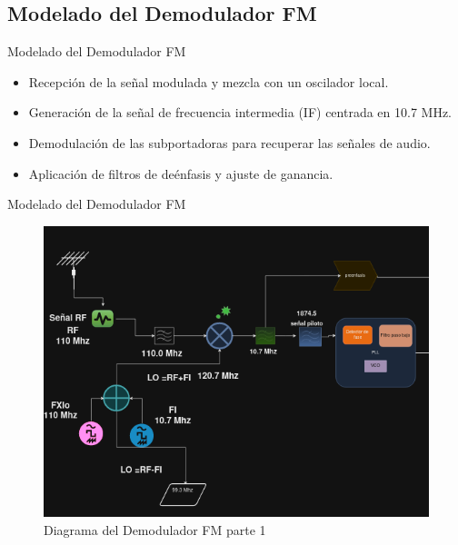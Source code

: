\documentclass[mathserif,spanish]{beamer}
\begin{document}
\subsection{Modelado del Demodulador FM}
\begin{frame}{Modelado del Demodulador FM}
    \begin{itemize}
        \item Recepción de la señal modulada y mezcla con un oscilador local.
        \item Generación de la señal de frecuencia intermedia (IF) centrada en 10.7 MHz.
        \item Demodulación de las subportadoras para recuperar las señales de audio.
        \item Aplicación de filtros de deénfasis y ajuste de ganancia.
    \end{itemize}
    
\end{frame}

\begin{frame}{Modelado del Demodulador FM}
   
    \begin{figure}[h]
        \centering
        \includegraphics[scale=0.3]{demo_02.png}
        \caption{Diagrama del Demodulador FM parte 1}
    \end{figure}
\end{frame}
\end{document}
